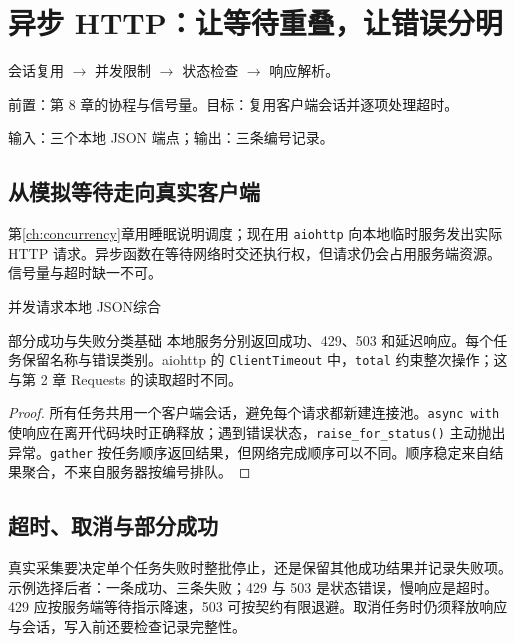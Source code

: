 \chapter{异步 HTTP：让等待重叠，让错误分明}\label{ch:async-http}
\begin{tcolorbox}[title=章首知识地图,colframe=Ink]
会话复用 $\longrightarrow$ 并发限制 $\longrightarrow$ 状态检查 $\longrightarrow$ 响应解析。
\end{tcolorbox}

\begin{tcolorbox}[title=学习目标与前置知识,colframe=Ink!65,colback=Ink!2]
前置：第 8 章的协程与信号量。目标：复用客户端会话并逐项处理超时。\par
输入：三个本地 JSON 端点；输出：三条编号记录。
\end{tcolorbox}

\section{从模拟等待走向真实客户端}
第\ref{ch:concurrency}章用睡眠说明调度；现在用 \texttt{aiohttp} 向本地临时服务发出实际 HTTP 请求。异步函数在等待网络时交还执行权，但请求仍会占用服务端资源。信号量与超时缺一不可。

\begin{example}{并发请求本地 JSON}{综合}
\end{example}

\begin{example}{部分成功与失败分类}{基础}
本地服务分别返回成功、429、503 和延迟响应。每个任务保留名称与错误类别。aiohttp 的 \texttt{ClientTimeout} 中，\texttt{total} 约束整次操作；这与第 2 章 Requests 的读取超时不同。
\end{example}

\begin{proof}
所有任务共用一个客户端会话，避免每个请求都新建连接池。\texttt{async with} 使响应在离开代码块时正确释放；遇到错误状态，\texttt{raise\_for\_status()} 主动抛出异常。\texttt{gather} 按任务顺序返回结果，但网络完成顺序可以不同。顺序稳定来自结果聚合，不来自服务器按编号排队。
\end{proof}

\section{超时、取消与部分成功}
真实采集要决定单个任务失败时整批停止，还是保留其他成功结果并记录失败项。示例选择后者：一条成功、三条失败；429 与 503 是状态错误，慢响应是超时。429 应按服务端等待指示降速，503 可按契约有限退避。取消任务时仍须释放响应与会话，写入前还要检查记录完整性。

